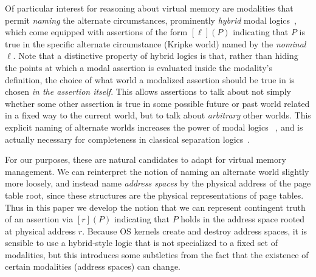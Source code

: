 Of particular interest for reasoning about virtual memory are modalities that permit \emph{naming} the alternate 
circumstances, prominently \emph{hybrid} modal logics~\cite{blackburn1995hybrid,areces2001hybrid}, which come equipped 
with assertions of the form $[\ell](P)$ indicating that $P$ is true in the specific alternate circumstance (Kripke world)
 named by the \emph{nominal} $\ell$. Note that a distinctive property of hybrid logics is that, rather than hiding
the points at which a modal assertion is evaluated inside the modality's definition, the choice of what world a modalized
assertion should be true in is chosen \emph{in the assertion itself}. This allows assertions to talk about not simply whether some other assertion
is true in some possible future or past world related in a fixed way to the current world, but to talk about \emph{arbitrary}
other worlds.
This explicit naming of alternate worlds increases the power of modal logics ~\cite{blackburn1995hybrid}, and is actually
necessary for completeness in classical separation logics~\cite{brotherston2014parametric}.

For our purposes, these are natural candidates to adapt for virtual memory management. We can reinterpret the notion of 
naming an alternate world slightly more loosely, and instead name \emph{address spaces} by the physical address of the 
page table root, since these structures are the physical representations of page tables. Thus in this paper we develop 
the notion that we can represent contingent truth of an assertion via $[r](P)$ indicating that $P$ holds in the address 
space rooted at physical address $r$. Because OS kernels create and destroy address spaces, it is sensible to use
a hybrid-style logic that is not specialized to a fixed set of modalities, but this introduces
some subtleties from the fact that the existence of certain modalities (address spaces) can change.

